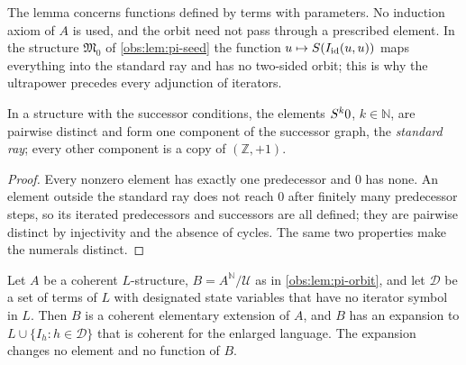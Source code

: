 The lemma concerns functions defined by terms with parameters. No induction
axiom of $A$ is used, and the orbit need not pass through a prescribed
element. In the structure $\mathfrak{M}_0$ of \cref{obs:lem:pi-seed} the
function $u\mapsto S(I_{\mathrm{id}}(u,u))$ maps everything into the standard
ray and has no two-sided orbit; this is why the ultrapower precedes every
adjunction of iterators.

\begin{lemma}[Chains]
\label{obs:lem:pi-chains}
In a structure with the successor conditions, the elements $S^{k}0$,
$k\in\mathbb{N}$, are pairwise distinct and form one component of the successor
graph, the \emph{standard ray}; every other component is a copy of
$(\mathbb{Z},+1)$.
\end{lemma}

\begin{proof}
Every nonzero element has exactly one predecessor and $0$ has none. An element
outside the standard ray does not reach $0$ after finitely many predecessor
steps, so its iterated predecessors and successors are all defined; they are
pairwise distinct by injectivity and the absence of cycles. The same two
properties make the numerals distinct.
\end{proof}

\begin{lemma}
\label{obs:lem:pi-extension}
Let $A$ be a coherent $L$-structure, $B=A^{\mathbb{N}}/\mathcal{U}$ as in
\cref{obs:lem:pi-orbit}, and let $\mathcal{D}$ be a set of terms of $L$ with
designated state variables that have no iterator symbol in $L$. Then $B$ is a
coherent elementary extension of $A$, and $B$ has an expansion to
$L\cup\{I_h:h\in\mathcal{D}\}$ that is coherent for the enlarged language. The
expansion changes no element and no function of $B$.
\end{lemma}

